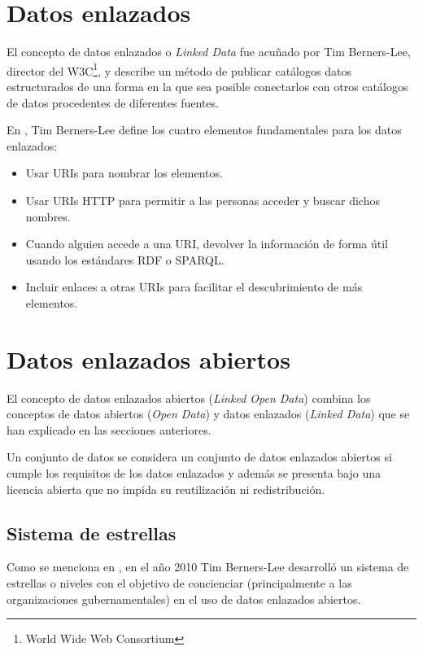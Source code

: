 \section{Datos enlazados}
El concepto de datos enlazados o \textit{Linked Data} fue acuñado por Tim Berners-Lee, director del W3C\footnote{World Wide Web Consortium}, y describe un método de publicar catálogos datos estructurados de una forma en la que sea posible conectarlos con otros catálogos de datos procedentes de diferentes fuentes.

En \cite{tbl-linkedopendata}, Tim Berners-Lee define los cuatro elementos fundamentales para los datos enlazados:
\begin{itemize}
\item Usar URIs para nombrar los elementos.
\item Usar URIs HTTP para permitir a las personas acceder y buscar dichos nombres.
\item Cuando alguien accede a una URI, devolver la información de forma útil usando los estándares RDF o SPARQL.
\item Incluir enlaces a otras URIs para facilitar el descubrimiento de más elementos.
\end{itemize}


\section{Datos enlazados abiertos}
El concepto de datos enlazados abiertos (\textit{Linked Open Data}) combina los conceptos de datos abiertos (\textit{Open Data}) y datos enlazados (\textit{Linked Data}) que se han explicado en las secciones anteriores.

Un conjunto de datos se considera un conjunto de datos enlazados abiertos si cumple los requisitos de los datos enlazados y además se presenta bajo una licencia abierta que no impida su reutilización ni redistribución.


\subsection{Sistema de estrellas}
Como se menciona en \cite{tbl-linkedopendata}, en el año 2010 Tim Berners-Lee desarrolló un sistema de estrellas o niveles con el objetivo de concienciar (principalmente a las organizaciones gubernamentales) en el uso de datos enlazados abiertos.

